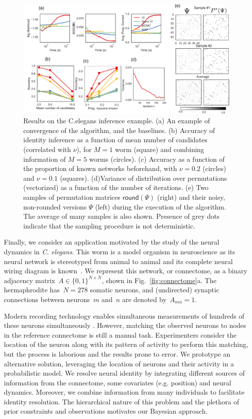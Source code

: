 \documentclass[twoside]{article}
\begin{document}
\begin{figure}[ht]
  \centering
  \includegraphics[width=6in]{../figures/figure7.pdf} 
  \caption{Results on the C.elegans inference example. (a) An example of convergence of the algorithm, and the baselines. (b) Accuracy of identity inference as a function of mean number of candidates (correlated with $\nu$), for $M=1$ worm (square) and combining information of $M=5$ worms (circles). (c) Accuracy as a function of the proportion of known networks beforehand,  with $\nu=0.2$ (circles) and $\nu=0.1$ (squares). (d)Variance of distribution over permutations (vectorized) as a function of the number of iterations. (e) Two samples of permutation matrices $\mathsf{round}(\Psi)$ (right) and their noisy, non-rounded versions $\Psi$ (left) during the execution of the algorithm. The average of many samples is also shown. Presence of grey dots indicate that the sampling procedure is not deterministic.}
  \vspace{-1.em}
\label{fig:elegantresults}
\end{figure}


Finally, we consider an application motivated by the study of the
neural dynamics in \textit{C. elegans}. This worm is a model organism
in neuroscience as its neural network is stereotyped from animal to
animal and its complete neural wiring diagram is
known~\citep{varshney2011structural}.  We represent this network, or
connectome, as a binary adjacency
matrix~${A \in \{0,1\}^{N \times N}}$, shown in
Fig.~\ref{fig:connectome}a. The hermaphrodite has~${N=278}$ somatic
neurons, and (undirected) synaptic connections between neurons~$m$
and~$n$ are denoted by~$A_{mn}=1$.


Modern recording technology enables simultaneous measurements of
hundreds of these neurons simultaneously \citep{Kato2015,
  nguyen2016whole}.  However, matching the observed neurons to nodes
in the reference connectome is still a manual task.  Experimenters
consider the location of the neuron along with its pattern of activity
to perform this matching, but the process is laborious and the results
prone to error. We prototype an alternative solution, leveraging the
location of neurons and their activity in a probabilistic model. We
resolve neural identity by integrating different sources of
information from the connectome, some covariates (e.g. position) and
neural dynamics. Moreover, we combine information from many
individuals to facilitate identity resolution.  The hierarchical
nature of this problem and the plethora of prior constraints and
observations motivates our Bayesian approach.
\end{document}
